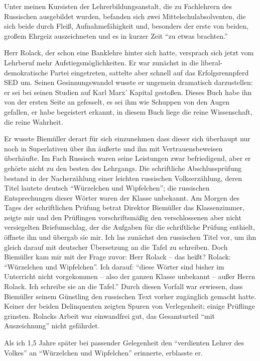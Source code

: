 Unter meinen Kursisten der Lehrerbildungsanstalt, die zu Fachlehrern des Russischen ausgebildet wurden, befanden sich zwei Mittelschulabsolventen, die sich beide durch Fleiß, Aufnahmefähigkeit und, besonders der erste von beiden, großem Ehrgeiz auszeichneten  und es in kurzer Zeit \enquote{zu etwas brachten.}

Herr Rolack, der schon eine Banklehre hinter sich hatte, versprach sich jetzt vom Lehrberuf mehr Aufstiegsmöglichkeiten. Er war zunächst in die liberal-demokratische Partei eingetreten, sattelte aber schnell auf das Erfolgsrennpferd SED um. Seinen Gesinnungswandel wusste er ungemein dramatisch darzustellen: er sei bei seinen Studien auf Karl Marx' Kapital gestoßen. Dieses Buch habe ihn von der ersten Seite an gefesselt, es sei ihm wie Schuppen von den Augen gefallen, er habe begeistert erkannt, in diesem Buch liege die reine Wissenschaft, die reine Wahrheit.

Er wusste Biemüller derart für sich einzunehmen dass dieser sich überhaupt nur noch in Superlativen über ihn äußerte und ihn mit Vertrauensbeweisen überhäufte. Im Fach Russisch waren seine Leistungen zwar befriedigend, aber er gehörte nicht zu den besten des Lehrgangs. Die schriftliche Abschlussprüfung bestand in der Nacherzählung einer leichten russischen Volkserzählung, deren Titel lautete deutsch \enquote{Würzelchen und Wipfelchen}; die russischen Entsprechungen dieser Wörter waren der Klasse unbekannt. Am Morgen des Tages der schriftlichen Prüfung betrat Direktor Biemüller das Klassenzimmer, zeigte mir und den Prüflingen  vorschriftsmäßig den verschlossenen aber nicht versiegelten Briefumschlag, der die Aufgaben für die schriftliche Prüfung enthielt, öffnete ihn und übergab sie mir. Ich las zunächst den russischen Titel vor, um ihn gleich darauf mit deutscher Übersetzung an die Tafel zu schreiben. Doch Biemüller kam mir mit der Frage zuvor: Herr Rolack -- das heißt? Rolack: \enquote{Würzelchen und Wipfelchen}. Ich darauf: \enquote{diese Wörter sind bisher im Unterricht nicht vorgekommen -- also der ganzen Klasse unbekannt -- außer Herrn Rolack. Ich schreibe sie an die Tafel.} Durch diesen Vorfall war erwiesen, dass Biemüller seinem Günstling den russischen Text vorher zugänglich gemacht hatte. Keiner der beiden Delinquenten zeigten Spuren von Verlegenheit; einige Prüflinge grinsten. Rolacks Arbeit war einwandfrei gut, das Gesamturteil \enquote{mit Auszeichnung} nicht gefährdet.

Als ich 1,5 Jahre später bei passender Gelegenheit den \enquote{verdienten Lehrer des Volkes} an \enquote{Würzelchen und Wipfelchen} erinnerte, erblasste er.

